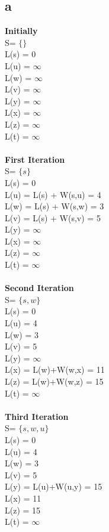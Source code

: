 \documentclass[11pt]{article}
\begin{document}
\subsection*{a}
\textbf{Initially} \\
S= $\{ \}$ \\
L(s) = 0 \\
L(u) = $\infty$\\
L(w) = $\infty$\\
L(v) = $\infty$\\
L(y) = $\infty$\\
L(x) = $\infty$\\
L(z) = $\infty$\\
L(t) = $\infty$\\ \\
\textbf{First Iteration} \\
S= $\{s \}$ \\
L(s) = 0 \\
L(u) = L(s) + W(s,u) = 4\\
L(w) = L(s) + W(s,w) = 3\\
L(v) = L(s) + W(s,v) = 5 \\
L(y) = $\infty$\\
L(x) = $\infty$\\
L(z) = $\infty$\\
L(t) = $\infty$\\ \\
\textbf{Second Iteration}\\
S= $\{ s,w \}$ \\
L(s) = 0 \\
L(u) = 4\\
L(w) = 3\\
L(v) = 5\\
L(y) = $\infty$\\
L(x) = L(w)+W(w,x) = 11\\
L(z) = L(w)+W(w,z) = 15\\
L(t) = $\infty$\\ \\
\textbf{Third Iteration}\\
S= $\{ s,w,u \}$ \\
L(s) = 0 \\
L(u) = 4\\
L(w) = 3\\
L(v) = 5\\
L(y) = L(u)+W(u,y) = 15\\
L(x) = 11\\
L(z) = 15\\
L(t) = $\infty$\\ \\
\end{document}
